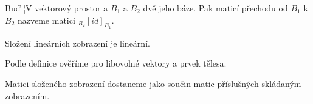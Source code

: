 \documentclass[12pt]{article}					%
\begin{document}
    \begin{definice}
            Buď ¦V vektorový prostor a $B_1$ a $B_2$ dvě jeho báze. Pak maticí přechodu od $B_1$ k $B_2$ nazveme matici $_{B_2}[id]_{B_1}$.
    \end{definice}

    \begin{tvrzeni}
        Složení lineárních zobrazení je lineární.
        \begin{dukazin}
            Podle definice ověříme pro libovolné vektory a prvek tělesa.
        \end{dukazin}
    \end{tvrzeni}

    \begin{veta}
        Matici složeného zobrazení dostaneme jako součin matic příslušných skládaným zobrazením.
    \end{veta}
    
\end{document}
